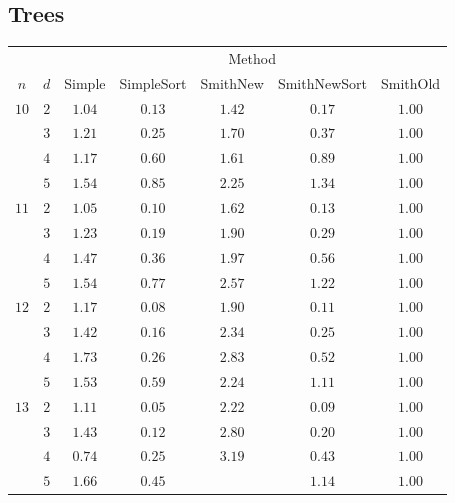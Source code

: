 \subsection{Trees}
\label{sec:trees}

\begin{table}[htbp]
  \centering
  \begin{tabular}{ccccccc}
    \toprule
         &     & \multicolumn{5}{c}{Method}                               \\
    \cmidrule(l){3-7}
    $n$  & $d$ & Simple & SimpleSort & SmithNew & SmithNewSort & SmithOld \\
    \cmidrule(r){1-2}\cmidrule(l){3-7}
    $10$ & $2$ & $1.04$ & $0.13$     & $1.42$   & $0.17$       & $1.00$   \\
         & $3$ & $1.21$ & $0.25$     & $1.70$   & $0.37$       & $1.00$   \\
         & $4$ & $1.17$ & $0.60$     & $1.61$   & $0.89$       & $1.00$   \\
         & $5$ & $1.54$ & $0.85$     & $2.25$   & $1.34$       & $1.00$   \\
    \cmidrule(r){1-2}
    $11$ & $2$ & $1.05$ & $0.10$     & $1.62$   & $0.13$       & $1.00$   \\
         & $3$ & $1.23$ & $0.19$     & $1.90$   & $0.29$       & $1.00$   \\
         & $4$ & $1.47$ & $0.36$     & $1.97$   & $0.56$       & $1.00$   \\
         & $5$ & $1.54$ & $0.77$     & $2.57$   & $1.22$       & $1.00$   \\
    \cmidrule(r){1-2}
    $12$ & $2$ & $1.17$ & $0.08$     & $1.90$   & $0.11$       & $1.00$   \\
         & $3$ & $1.42$ & $0.16$     & $2.34$   & $0.25$       & $1.00$   \\
         & $4$ & $1.73$ & $0.26$     & $2.83$   & $0.52$       & $1.00$   \\
         & $5$ & $1.53$ & $0.59$     & $2.24$   & $1.11$       & $1.00$   \\
    \cmidrule(r){1-2}
    $13$ & $2$ & $1.11$ & $0.05$     & $2.22$   & $0.09$       & $1.00$   \\
         & $3$ & $1.43$ & $0.12$     & $2.80$   & $0.20$       & $1.00$   \\
         & $4$ & $0.74$ & $0.25$     & $3.19$   & $0.43$       & $1.00$   \\
         & $5$ & $1.66$ & $0.45$     &          & $1.14$       & $1.00$   \\

\end{tabular}
\end{table}
